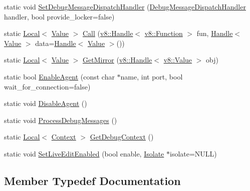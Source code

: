 \begin{DoxyCompactItemize}
\item 
static void \hyperlink{classv8_1_1_debug_a5147f6cfeb9b87a67630b8c959996e9c}{Set\+Debug\+Message\+Dispatch\+Handler} (\hyperlink{classv8_1_1_debug_a91cd8aa9743e3478bc63fe73abcd557c}{Debug\+Message\+Dispatch\+Handler} handler, bool provide\+\_\+locker=false)
\item 
static \hyperlink{classv8_1_1_local}{Local}$<$ \hyperlink{classv8_1_1_value}{Value} $>$ \hyperlink{classv8_1_1_debug_a49a3e0cf585cfd201d8ab1bc395d0593}{Call} (\hyperlink{classv8_1_1_handle}{v8\+::\+Handle}$<$ \hyperlink{classv8_1_1_function}{v8\+::\+Function} $>$ fun, \hyperlink{classv8_1_1_handle}{Handle}$<$ \hyperlink{classv8_1_1_value}{Value} $>$ data=\hyperlink{classv8_1_1_handle}{Handle}$<$ \hyperlink{classv8_1_1_value}{Value} $>$())
\item 
static \hyperlink{classv8_1_1_local}{Local}$<$ \hyperlink{classv8_1_1_value}{Value} $>$ \hyperlink{classv8_1_1_debug_aa7d07c7d5c9ee2eaaa9af310bcbf58f5}{Get\+Mirror} (\hyperlink{classv8_1_1_handle}{v8\+::\+Handle}$<$ \hyperlink{classv8_1_1_value}{v8\+::\+Value} $>$ obj)
\item 
static bool \hyperlink{classv8_1_1_debug_a78506e80b599010624c5fcde72a643a7}{Enable\+Agent} (const char $\ast$name, int port, bool wait\+\_\+for\+\_\+connection=false)
\item 
static void \hyperlink{classv8_1_1_debug_aa9b8f5fe4545f52f5937d61e972dcbf0}{Disable\+Agent} ()
\item 
static void \hyperlink{classv8_1_1_debug_a888e06766caee0380c6aa010b00e1a54}{Process\+Debug\+Messages} ()
\item 
static \hyperlink{classv8_1_1_local}{Local}$<$ \hyperlink{classv8_1_1_context}{Context} $>$ \hyperlink{classv8_1_1_debug_a2343a321b0db41324b7e8a7402f57cf0}{Get\+Debug\+Context} ()
\item 
static void \hyperlink{classv8_1_1_debug_a36c91138cdc2468a6ca019db243ed19f}{Set\+Live\+Edit\+Enabled} (bool enable, \hyperlink{classv8_1_1_isolate}{Isolate} $\ast$isolate=N\+U\+L\+L)
\end{DoxyCompactItemize}


\subsection{Member Typedef Documentation}
\hypertarget{classv8_1_1_debug_a91cd8aa9743e3478bc63fe73abcd557c}{}
